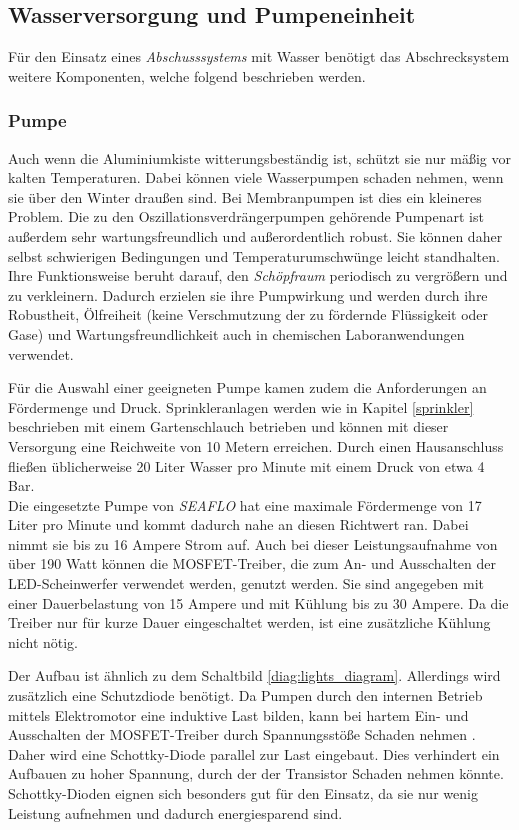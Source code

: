 \subsection{Wasserversorgung und Pumpeneinheit}

Für den Einsatz eines \textit{Abschusssystems} mit Wasser benötigt das Abschrecksystem weitere Komponenten, welche folgend beschrieben werden.

\subsubsection{Pumpe} \label{cap:pumpe}

Auch wenn die Aluminiumkiste witterungsbeständig ist, schützt sie nur mäßig vor kalten Temperaturen. Dabei können viele Wasserpumpen schaden nehmen, wenn sie über den Winter draußen sind. Bei Membranpumpen ist dies ein kleineres Problem. Die zu den Oszillationsverdrängerpumpen gehörende Pumpenart ist außerdem sehr wartungsfreundlich und außerordentlich robust. Sie können daher selbst schwierigen Bedingungen und Temperaturumschwünge leicht standhalten.
\\
Ihre Funktionsweise beruht darauf, den \textit{Schöpfraum} periodisch zu vergrößern und zu verkleinern. Dadurch erzielen sie ihre Pumpwirkung und werden durch ihre Robustheit, Ölfreiheit (keine Verschmutzung der zu fördernde Flüssigkeit oder Gase) und Wartungsfreundlichkeit auch in chemischen Laboranwendungen verwendet. \cite{Jousten2018}

Für die Auswahl einer geeigneten Pumpe kamen zudem die Anforderungen an Fördermenge und Druck. Sprinkleranlagen werden wie in Kapitel \ref{sprinkler} beschrieben mit einem Gartenschlauch betrieben und können mit dieser Versorgung eine Reichweite von 10 Metern erreichen. Durch einen Hausanschluss fließen üblicherweise 20 Liter Wasser pro Minute mit einem Druck von etwa 4 Bar.\\
Die eingesetzte Pumpe von \textit{SEAFLO} hat eine maximale Fördermenge von 17 Liter pro Minute und kommt dadurch nahe an diesen Richtwert ran. Dabei nimmt sie bis zu 16 Ampere Strom auf. Auch bei dieser Leistungsaufnahme von über 190 Watt können die MOSFET-Treiber, die zum An- und Ausschalten der LED-Scheinwerfer verwendet werden, genutzt werden. Sie sind angegeben mit einer Dauerbelastung von 15 Ampere und mit Kühlung bis zu 30 Ampere. Da die Treiber nur für kurze Dauer eingeschaltet werden, ist eine zusätzliche Kühlung nicht nötig. \cite{mosfets_am,seaflo_pump}

Der Aufbau ist ähnlich zu dem Schaltbild \ref{diag:lights_diagram}. Allerdings wird zusätzlich eine Schutzdiode benötigt. Da Pumpen durch den internen Betrieb mittels Elektromotor eine induktive Last bilden, kann bei hartem Ein- und Ausschalten der MOSFET-Treiber durch Spannungsstöße Schaden nehmen \cite{induktive_last_diode}. Daher wird eine Schottky-Diode parallel zur Last eingebaut. Dies verhindert ein Aufbauen zu hoher Spannung, durch der der Transistor Schaden nehmen könnte. Schottky-Dioden eignen sich besonders gut für den Einsatz, da sie nur wenig Leistung aufnehmen und dadurch energiesparend sind. \cite{induktive_last_diode,am_schottky}

